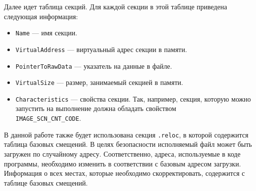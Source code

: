 Далее идет таблица секций. Для каждой секции в этой таблице приведена следующая
информация:
\begin{itemize}
  \item \verb!Name! --- имя секции. 
  \item \verb!VirtualAddress! --- виртуальный адрес секции в памяти.
  \item \verb!PointerToRawData! --- указатель на данные в файле.
  \item \verb!VirtualSize! --- размер, занимаемый секцией в памяти.
  \item \verb!Characteristics! --- свойства секции. Так, например, секция,
    которую можно запустить на выполнение должна обладать свойством
    \\ \verb!IMAGE_SCN_CNT_CODE!.
\end{itemize}

\enlargethispage{\baselineskip}
В данной работе также будет использована секция \verb!.reloc!, в которой
содержится таблица базовых смещений. В целях безопасности исполняемый файл может
быть загружен по случайному адресу. Соответственно, адреса, используемые в коде
программы, необходимо изменить в соответствии с базовым адресом загрузки.
Информация о всех местах, которые необходимо скорректировать, содержится с
таблице базовых смещений.

%
